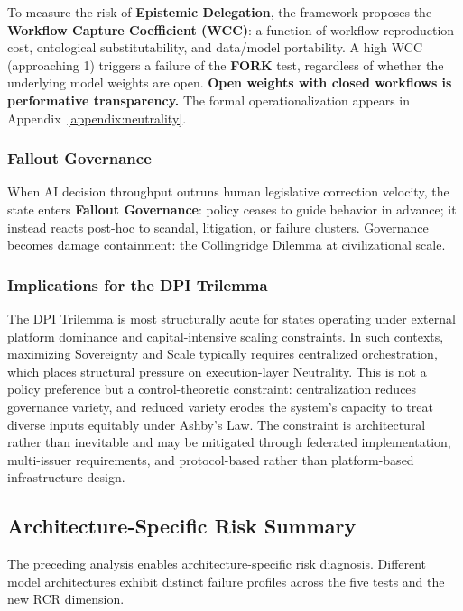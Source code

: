 \documentclass{article}
\begin{document}
To measure the risk of \textbf{Epistemic Delegation}, the framework proposes the \textbf{Workflow Capture Coefficient (WCC)}: a function of workflow reproduction cost, ontological substitutability, and data/model portability. A high WCC (approaching 1) triggers a failure of the \textbf{FORK} test, regardless of whether the underlying model weights are open. \textbf{Open weights with closed workflows is performative transparency.} The formal operationalization appears in Appendix~\ref{appendix:neutrality}.

\subsubsection{Fallout Governance}

When AI decision throughput outruns human legislative correction velocity, the state enters \textbf{Fallout Governance}: policy ceases to guide behavior in advance; it instead reacts post-hoc to scandal, litigation, or failure clusters. Governance becomes damage containment: the Collingridge Dilemma at civilizational scale.

\subsubsection{Implications for the DPI Trilemma}

The DPI Trilemma is most structurally acute for states operating under external platform dominance and capital-intensive scaling constraints. In such contexts, maximizing Sovereignty and Scale typically requires centralized orchestration, which places structural pressure on execution-layer Neutrality. This is not a policy preference but a control-theoretic constraint: centralization reduces governance variety, and reduced variety erodes the system's capacity to treat diverse inputs equitably under Ashby's Law. The constraint is architectural rather than inevitable and may be mitigated through federated implementation, multi-issuer requirements, and protocol-based rather than platform-based infrastructure design.

\subsection{Architecture-Specific Risk Summary}

The preceding analysis enables architecture-specific risk diagnosis. Different model architectures exhibit distinct failure profiles across the five tests and the new RCR dimension.
\end{document}
